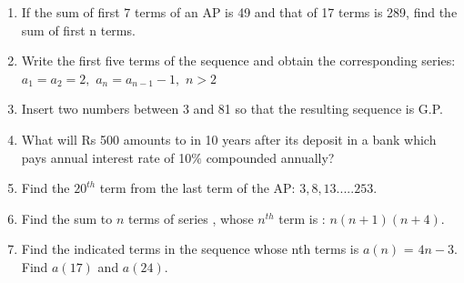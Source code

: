 \begin{enumerate}[label=\thesection.\arabic*,ref=\thesection.\theenumi]


\item If the sum of first 7 terms of an AP is 49 and that of 17 terms is 289, find the sum of first n terms.

\solution


\pagebreak

\item Write the first five terms of the sequence and obtain the corresponding series:\\
$a_1=a_2=2,$ $a_n=a_{n-1} -1,$ $n>2$\\
\solution

\pagebreak
\item Insert two numbers between 3 and 81 so that the resulting sequence is G.P.\\

\solution

\pagebreak

\item  What will Rs 500 amounts to in 10 years after its deposit in a bank which pays annual interest rate of 10$\%$ compounded annually?

\solution
    
\pagebreak

\item Find the $20^{th}$ term from the last term of the AP: $3,8,13.....253$.

\solution


\pagebreak
\item Find the sum to $n$ terms of series , whose $n^{th}$ term is : $n(n+1)(n+4)$.

\solution

\pagebreak

\item Find the indicated terms in the sequence whose nth terms is $a(n)$ = $4n-3$. Find $a(17)$ and $a(24)$.
    
\solution 

\pagebreak


\end{enumerate}
